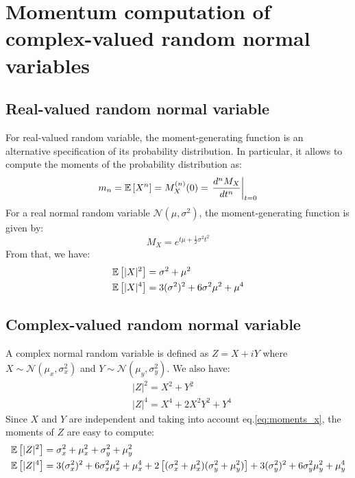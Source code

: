 \renewcommand{\theparagraph}{C}

\section{Momentum computation of complex-valued random normal variables}
\label{appC}
\subsection{Real-valued random normal variable}
For real-valued random variable, the moment-generating function is an alternative specification of its probability distribution. In particular, it allows to compute the moments of the probability distribution as:
\begin{equation}
m_n = \mathbb{E} \left[X^n\right] = M_X^{(n)}(0) = \left. \frac{d^n M_X}{dt^n}\right|_{t=0}
\end{equation}
For a real normal random variable $\mathcal{N}(\mu,\sigma^2) $, the moment-generating function is given by:
\begin{equation}
M_X = e^{t \mu + \frac{1}{2} \sigma^2 t^2 }
\end{equation}
From that, we have:
\begin{equation}
\begin{split}
&\mathbb{E} \left[|X|^2\right] = \sigma^2 + \mu^2\\
&\mathbb{E} \left[|X|^4\right] = 3(\sigma^2)^2 + 6 \sigma^2 \mu^2 + \mu^4
\end{split}
\label{eq:moments_x}
\end{equation}

\subsection{Complex-valued random normal variable}
A complex normal random variable is defined as $Z = X + iY$ where $X \sim \mathcal{N}(\mu_x,\sigma^2_x)$ and $Y \sim \mathcal{N}(\mu_y,\sigma^2_y)$. We also have:
\begin{equation}
\begin{split}
&|Z|^2 = X^2 + Y^2\\
&|Z|^4 = X^4  + 2 X^2 Y^2 + Y^4
\end{split}
\label{eq:deriv_z}
\end{equation}
Since $X$ and $Y$ are independent and taking into account eq.\ref{eq:moments_x}, the moments of $Z$ are easy to compute:
\begin{equation}
\begin{split}
&\mathbb{E} \left[|Z|^2\right] = \sigma_x^2 + \mu_x^2 + \sigma_y^2 + \mu_y^2\\
&\mathbb{E} \left[|Z|^4\right] = 3(\sigma_x^2)^2 + 6 \sigma_x^2 \mu_x^2 + \mu_x^4 + 2\left[ ( \sigma_x^2 + \mu_x^2 )(\sigma_y^2 + \mu_y^2)\right] + 3(\sigma_y^2)^2 + 6 \sigma_y^2 \mu_y^2 + \mu_y^4
\end{split}
\label{eq:moments_z}
\end{equation}